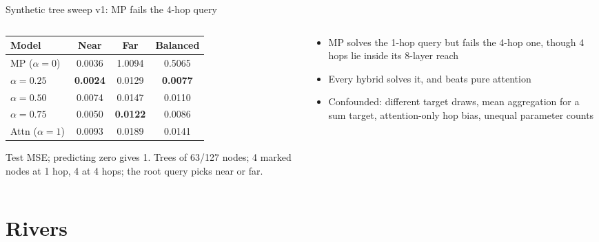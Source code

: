 \documentclass[aspectratio=169,10pt]{beamer}
\newcommand{\snote}[1]{{\scriptsize\textcolor{ink!70}{#1}}}
\begin{document}
\begin{frame}{Synthetic tree sweep v1: MP fails the 4-hop query}
  \begin{columns}[c]
    \begin{column}{0.5\textwidth}
      \centering\small
      \begin{tabular}{@{}lccc@{}}
        \toprule
        Model & Near & Far & Balanced \\
        \midrule
        MP ($\alpha=0$) & 0.0036 & \alert{1.0094} & 0.5065 \\
        $\alpha=0.25$ & \textbf{0.0024} & 0.0129 & \textbf{0.0077} \\
        $\alpha=0.50$ & 0.0074 & 0.0147 & 0.0110 \\
        $\alpha=0.75$ & 0.0050 & \textbf{0.0122} & 0.0086 \\
        Attn ($\alpha=1$) & 0.0093 & 0.0189 & 0.0141 \\
        \bottomrule
      \end{tabular}

      \snote{Test MSE; predicting zero gives 1. Trees of 63/127 nodes; 4 marked nodes at 1 hop, 4 at 4 hops; the root query picks near or far.}
    \end{column}
    \begin{column}{0.46\textwidth}
      \begin{itemize}
        \item MP solves the 1-hop query but fails the 4-hop one, though 4 hops lie inside its 8-layer reach
        \item Every hybrid solves it, and beats pure attention
        \item \alert{Confounded}: different target draws, mean aggregation for a sum target, attention-only hop bias, unequal parameter counts
      \end{itemize}
    \end{column}
  \end{columns}
\end{frame}

\section{Rivers}
\end{document}
